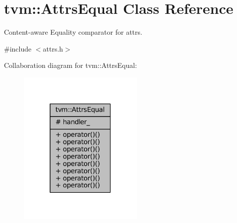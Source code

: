 \hypertarget{classtvm_1_1AttrsEqual}{}\section{tvm\+:\+:Attrs\+Equal Class Reference}
\label{classtvm_1_1AttrsEqual}


Content-\/aware Equality comparator for attrs.  




{\ttfamily \#include $<$attrs.\+h$>$}



Collaboration diagram for tvm\+:\+:Attrs\+Equal\+:
\nopagebreak
\begin{figure}[H]
\begin{center}
\leavevmode
\includegraphics[width=171pt]{classtvm_1_1AttrsEqual__coll__graph}
\end{center}
\end{figure}
